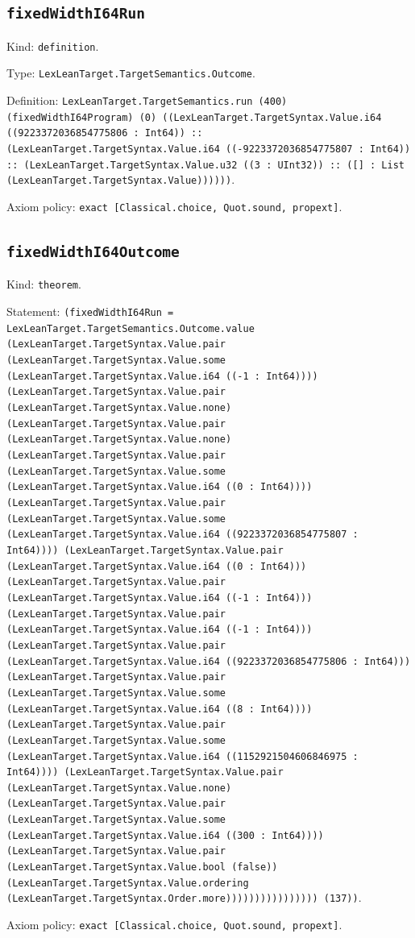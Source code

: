 \documentclass[11pt]{article}
\begin{document}
\subsection*{\texttt{fixedWidthI64Run}}
\noindent Kind: \texttt{definition}.\par
\noindent Type: \texttt{LexLeanTarget.TargetSemantics.Outcome}.\par
\noindent Definition: \texttt{LexLeanTarget.TargetSemantics.run (400) (fixedWidthI64Program) (0) ((LexLeanTarget.TargetSyntax.Value.i64 ((9223372036854775806 : Int64)) :: (LexLeanTarget.TargetSyntax.Value.i64 ((-9223372036854775807 : Int64)) :: (LexLeanTarget.TargetSyntax.Value.u32 ((3 : UInt32)) :: ([] : List (LexLeanTarget.TargetSyntax.Value))))))}.\par
\noindent Axiom policy: \texttt{exact [Classical.choice, Quot.sound, propext]}.\par
\subsection*{\texttt{fixedWidthI64Outcome}}
\noindent Kind: \texttt{theorem}.\par
\noindent Statement: \texttt{(fixedWidthI64Run = LexLeanTarget.TargetSemantics.Outcome.value (LexLeanTarget.TargetSyntax.Value.pair (LexLeanTarget.TargetSyntax.Value.some (LexLeanTarget.TargetSyntax.Value.i64 ((-1 : Int64)))) (LexLeanTarget.TargetSyntax.Value.pair (LexLeanTarget.TargetSyntax.Value.none) (LexLeanTarget.TargetSyntax.Value.pair (LexLeanTarget.TargetSyntax.Value.none) (LexLeanTarget.TargetSyntax.Value.pair (LexLeanTarget.TargetSyntax.Value.some (LexLeanTarget.TargetSyntax.Value.i64 ((0 : Int64)))) (LexLeanTarget.TargetSyntax.Value.pair (LexLeanTarget.TargetSyntax.Value.some (LexLeanTarget.TargetSyntax.Value.i64 ((9223372036854775807 : Int64)))) (LexLeanTarget.TargetSyntax.Value.pair (LexLeanTarget.TargetSyntax.Value.i64 ((0 : Int64))) (LexLeanTarget.TargetSyntax.Value.pair (LexLeanTarget.TargetSyntax.Value.i64 ((-1 : Int64))) (LexLeanTarget.TargetSyntax.Value.pair (LexLeanTarget.TargetSyntax.Value.i64 ((-1 : Int64))) (LexLeanTarget.TargetSyntax.Value.pair (LexLeanTarget.TargetSyntax.Value.i64 ((9223372036854775806 : Int64))) (LexLeanTarget.TargetSyntax.Value.pair (LexLeanTarget.TargetSyntax.Value.some (LexLeanTarget.TargetSyntax.Value.i64 ((8 : Int64)))) (LexLeanTarget.TargetSyntax.Value.pair (LexLeanTarget.TargetSyntax.Value.some (LexLeanTarget.TargetSyntax.Value.i64 ((1152921504606846975 : Int64)))) (LexLeanTarget.TargetSyntax.Value.pair (LexLeanTarget.TargetSyntax.Value.none) (LexLeanTarget.TargetSyntax.Value.pair (LexLeanTarget.TargetSyntax.Value.some (LexLeanTarget.TargetSyntax.Value.i64 ((300 : Int64)))) (LexLeanTarget.TargetSyntax.Value.pair (LexLeanTarget.TargetSyntax.Value.bool (false)) (LexLeanTarget.TargetSyntax.Value.ordering (LexLeanTarget.TargetSyntax.Order.more)))))))))))))))) (137))}.\par
\noindent Axiom policy: \texttt{exact [Classical.choice, Quot.sound, propext]}.\par
\end{document}
